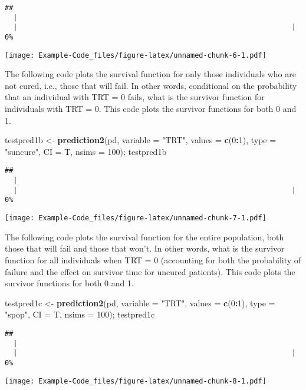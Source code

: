 \documentclass[]{article}
\newenvironment{Shaded}{\begin{snugshade}}{\end{snugshade}}
\newcommand{\DataTypeTok}[1]{\textcolor[rgb]{0.13,0.29,0.53}{#1}}
\newcommand{\DecValTok}[1]{\textcolor[rgb]{0.00,0.00,0.81}{#1}}
\newcommand{\KeywordTok}[1]{\textcolor[rgb]{0.13,0.29,0.53}{\textbf{#1}}}
\newcommand{\NormalTok}[1]{#1}
\newcommand{\OperatorTok}[1]{\textcolor[rgb]{0.81,0.36,0.00}{\textbf{#1}}}
\newcommand{\StringTok}[1]{\textcolor[rgb]{0.31,0.60,0.02}{#1}}
\begin{document}
\begin{verbatim}
## 
  |                                                                       
  |                                                                 |   0%
\end{verbatim}

\texttt{[image: Example-Code\_files/figure-latex/unnamed-chunk-6-1.pdf]}

The following code plots the survival function for only those
individuals who are not cured, i.e., those that will fail. In other
words, conditional on the probability that an individual with TRT = 0
fails, what is the survivor function for individuals with TRT = 0. This
code plots the survivor functions for both 0 and 1.

\begin{Shaded}
\begin{Highlighting}[]
\NormalTok{testpred1b <-}\StringTok{ }\KeywordTok{prediction2}\NormalTok{(pd, }\DataTypeTok{variable =} \StringTok{"TRT"}\NormalTok{, }\DataTypeTok{values =} \KeywordTok{c}\NormalTok{(}\DecValTok{0}\OperatorTok{:}\DecValTok{1}\NormalTok{), }\DataTypeTok{type =} \StringTok{"suncure"}\NormalTok{, }\DataTypeTok{CI =}\NormalTok{ T, }\DataTypeTok{nsims =} \DecValTok{100}\NormalTok{); testpred1b}
\end{Highlighting}
\end{Shaded}

\begin{verbatim}
## 
  |                                                                       
  |                                                                 |   0%
\end{verbatim}

\texttt{[image: Example-Code\_files/figure-latex/unnamed-chunk-7-1.pdf]}

The following code plots the survival function for the entire
population, both those that will fail and those that won't. In other
words, what is the survivor function for all individuals when TRT = 0
(accounting for both the probability of failure and the effect on
survivor time for uncured patients). This code plots the survivor
functions for both 0 and 1.

\begin{Shaded}
\begin{Highlighting}[]
\NormalTok{testpred1c <-}\StringTok{ }\KeywordTok{prediction2}\NormalTok{(pd, }\DataTypeTok{variable =} \StringTok{"TRT"}\NormalTok{, }\DataTypeTok{values =} \KeywordTok{c}\NormalTok{(}\DecValTok{0}\OperatorTok{:}\DecValTok{1}\NormalTok{), }\DataTypeTok{type =} \StringTok{"spop"}\NormalTok{, }\DataTypeTok{CI =}\NormalTok{ T, }\DataTypeTok{nsims =} \DecValTok{100}\NormalTok{); testpred1c}
\end{Highlighting}
\end{Shaded}

\begin{verbatim}
## 
  |                                                                       
  |                                                                 |   0%
\end{verbatim}

\texttt{[image: Example-Code\_files/figure-latex/unnamed-chunk-8-1.pdf]}
\end{document}

